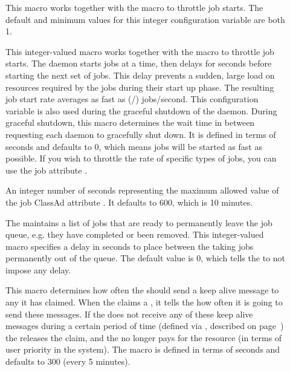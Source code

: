 \begin{description}
\item[] \label{param:JobStartCount} This
  macro works together with the  macro to
  throttle job starts.  The default and minimum values for this
  integer configuration variable are both 1.

\item[] \label{param:JobStartDelay}
  This integer-valued macro works together with the
   macro
  to throttle job starts.  The   daemon starts
   jobs at a time, then delays for
   seconds before starting the next set of jobs.
  This delay prevents a sudden, large load on resources required by
  the jobs during their start up phase.
  The resulting job start rate
  averages as fast as
  (/) jobs/second.
  This configuration variable is also used during the graceful shutdown of the
   daemon.
  During graceful shutdown, this macro determines the wait time in
  between requesting each  daemon to gracefully shut down.  
  It is defined in terms of seconds and defaults to 0, which means jobs
  will be started as fast as possible.  If you wish to throttle the rate
  of specific types of jobs, you can use the job attribute
  .

\item[] \label{param:MaxNextJobStartDelay}
  An integer number of seconds representing the maximum allowed value
  of the job ClassAd attribute .  It defaults to 600,
  which is 10 minutes.

\item[] \label{param:JobIsFinishedInterval}
  The  maintains a list of jobs that are ready to permanently
  leave the job queue, e.g. they have completed or been removed.  This
  integer-valued macro specifies a delay in seconds to place between the
  taking jobs permanently out of the queue.  The default value is 0, which
  tells the  to not impose any delay.  
  
\item[] \label{param:AliveInterval} This
  macro determines how often the  should send a keep
  alive message to any  it has claimed.
  When the  claims a , it tells the  how often it is
  going to send these messages.
  If the  does not receive any of these keep alive messages
  during a certain period of time (defined via
  , described on
  page~\pageref{param:MaxClaimAlivesMissed})
  the  releases the claim, and the  no longer pays for
  the resource (in terms of user priority in the system).
  The macro is defined in terms of seconds and defaults to 300 (every
  5 minutes).


\end{description}
